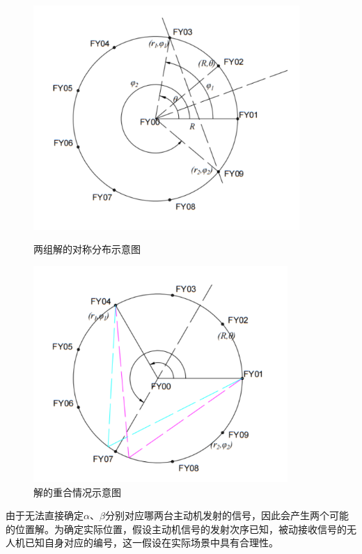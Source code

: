 \documentclass[withoutpreface,bwprint]{cumcmthesis} %
\begin{document}
\begin{figure}[htbp]
    \centering
    \begin{minipage}{0.49\textwidth}
        \centering
        \includegraphics[width=0.9\textwidth]{../../figure/q1_3.png} 
        \caption{两组解的对称分布示意图}
        \label{q1_3}
    \end{minipage}
    \begin{minipage}{0.49\textwidth}
        \centering
        \includegraphics[width=0.86\textwidth]{../../figure/q1_4.png} 
        \caption{解的重合情况示意图}
        \label{q1_4}   
    \end{minipage}
\end{figure}


由于无法直接确定\(\alpha\)、\(\beta\)分别对应哪两台主动机发射的信号，因此会产生两个可能的位置解。为确定实际位置，假设主动机信号的发射次序已知，被动接收信号的无人机已知自身对应的编号，这一假设在实际场景中具有合理性。
\end{document}
